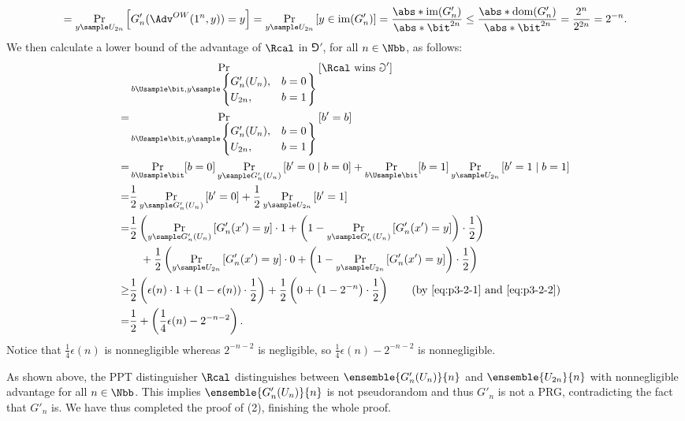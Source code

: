 \begin{answer}[b]
\begin{equation}
        =\Pr_{y \sample U_{2n}}\left[G'_n(\Adv^{OW}(1^n, y))=y \right]
        =\Pr_{y \sample U_{2n}}\left[y\in \mathop{\textrm{im}} (G'_n)\right]
        =\frac{\abs*{\mathop{\textrm{im}} (G'_n)}}{\abs*{\bit^{2n}}}
        \le \frac{\abs*{\mathop{\textrm{dom}} (G'_n)}}{\abs*{\bit^{2n}}}
        = \frac{2^n}{2^{2n}} 
        = 2^{-n}. 
    \end{equation}
    We then calculate a lower bound of the advantage of $\Rcal$ in $\Game'$, for all $n\in\Nbb$, as follows:
    \begin{align*}
        &\Pr_{b\Usample\bit, y \sample \left.\begin{cases} 
                G'_n(U_n), &b = 0 \\
                U_{2n}, &b = 1 
            \end{cases}\right\}}\left[ \Rcal \textrm{ wins } \Game' \right]\\
        =&\Pr_{b\Usample\bit, y \sample \left.\begin{cases} 
                G'_n(U_n), &b = 0 \\
                U_{2n}, &b = 1 
            \end{cases}\right\}}\left[ b'=b \right]\\
        =&\Pr_{b\Usample\bit}[b=0]\Pr_{y \sample G'_n(U_n)}\left[b'=0 \mid b=0 \right]
        + \Pr_{b\Usample\bit}[b=1]\Pr_{y \sample U_{2n}}\left[b'=1 \mid b=1 \right]\\
        =&\frac{1}{2}\Pr_{y \sample G'_n(U_n)}\left[b'=0  \right]
        + \frac{1}{2}\Pr_{y \sample U_{2n}}\left[b'=1 \right]\\
        =&\frac{1}{2} \left(\Pr_{y \sample G'_n(U_n)}\left[G'_n(x')=y  \right]\cdot 1 + \left(1- \Pr_{y \sample G'_n(U_n)}\left[G'_n(x')=y  \right]\right) \cdot \frac{1}{2} \right)\\
        &\quad +\frac{1}{2} \left(\Pr_{y \sample U_{2n}}\left[G'_n(x')=y \right]\cdot 0 + \left(1- \Pr_{y \sample U_{2n}}\left[G'_n(x')=y \right]\right) \cdot \frac{1}{2} \right)\\
        \ge&\frac{1}{2} \left(\epsilon(n)\cdot 1 + \left(1- \epsilon(n)\right) \cdot \frac{1}{2} \right)
        +\frac{1}{2} \left(0+\left(1- 2^{-n} \right) \cdot \frac{1}{2} \right)
        \qquad (\textrm{by \eqref{eq:p3-2-1} and \eqref{eq:p3-2-2}})\\
        =& \frac{1}{2}+\left(\frac{1}{4}\epsilon(n)-2^{-n-2}\right).
    \end{align*}
    Notice that $\frac{1}{4}\epsilon(n)$ is nonnegligible whereas $2^{-n-2}$ is negligible, so $\frac{1}{4}\epsilon(n)-2^{-n-2}$ is nonnegligible.

    As shown above, the PPT distinguisher $\Rcal$ distinguishes between $\ensemble{G'_n(U_n)}{n}$ and $\ensemble{U_{2n}}{n}$ with nonnegligible advantage for all $n\in\Nbb$. This implies $\ensemble{G'_n(U_n)}{n}$ is not pseudorandom and thus $G'_n$ is not a PRG, contradicting the fact that $G'_n$ is. We have thus completed the proof of (2), finishing the whole proof.
\end{answer}
